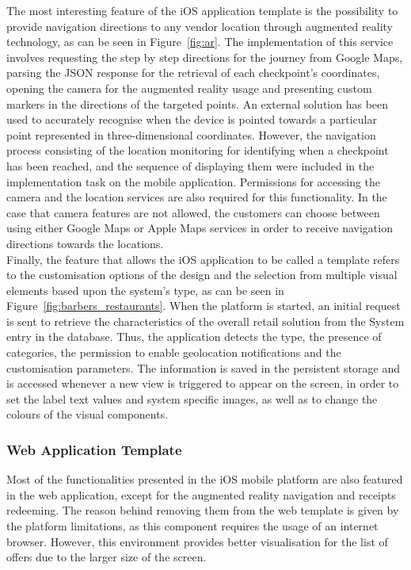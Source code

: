 The most interesting feature of the iOS application template is the possibility to provide navigation directions to any vendor location through augmented reality technology, as can be seen in Figure~\ref{fig:ar}. The implementation of this service involves requesting the step by step directions for the journey from Google Maps, parsing the JSON response for the retrieval of each checkpoint's coordinates, opening the camera for the augmented reality usage and presenting custom markers in the directions of the targeted points. An external solution has been used to accurately recognise when the device is pointed towards a particular point represented in three-dimensional coordinates. However, the navigation process consisting of the location monitoring for identifying when a checkpoint has been reached, and the sequence of displaying them were included in the implementation task on the mobile application. Permissions for accessing the camera and the location services are also required for this functionality. In the case that camera features are not allowed, the customers can choose between using either Google Maps or Apple Maps services in order to receive navigation directions towards the locations.\\

Finally, the feature that allows the iOS application to be called a template refers to the customisation options of the design and the selection from multiple visual elements based upon the system's type, as can be seen in Figure~\ref{fig:barbers_restaurants}. When the platform is started, an initial request is sent to retrieve the characteristics of the overall retail solution from the System entry in the database. Thus, the application detects the type, the presence of categories, the permission to enable geolocation notifications and the customisation parameters. The information is saved in the persistent storage and is accessed whenever a new view is triggered to appear on the screen, in order to set the label text values and system specific images, as well as to change the colours of the visual components.

\subsubsection{Web Application Template}

Most of the functionalities presented in the iOS mobile platform are also featured in the web application, except for the augmented reality navigation and receipts redeeming. The reason behind removing them from the web template is given by the platform limitations, as this component requires the usage of an internet browser. However, this environment provides better visualisation for the list of offers due to the larger size of the screen. \\

